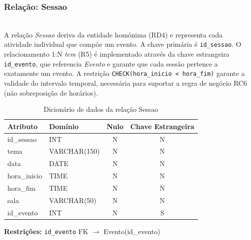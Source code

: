 \documentclass[runningheads]{llncs}
\begin{document}
                \vspace{0.3cm}
                \noindent\begin{minipage}{\textwidth}
                \subsubsection{Relação: Sessao}\mbox{}\\

                A relação \textit{Sessao} deriva da entidade homónima (RD4) e representa cada
                atividade individual que compõe um evento. A chave primária é
                \texttt{id\_sessao}. O relacionamento 1:N \textit{tem} (R5) é implementado através
                da chave estrangeira \texttt{id\_evento}, que referencia \textit{Evento} e garante
                que cada sessão pertence a exatamente um evento. A restrição
                \texttt{CHECK(hora\_inicio < hora\_fim)} garante a validade do intervalo temporal,
                necessária para suportar a regra de negócio RC6 (não sobreposição de horários).

                \begin{table}[H]
                \centering
                \renewcommand{\arraystretch}{1.4}
                \begin{tabular}{|l|l|c|c|}
                \hline
                \textbf{Atributo} & \textbf{Domínio} & \textbf{Nulo} & \textbf{Chave Estrangeira} \\ \hline
                id\_sessao   & INT          & N & N \\ \hline
                tema         & VARCHAR(150) & N & N \\ \hline
                data         & DATE         & N & N \\ \hline
                hora\_inicio & TIME         & N & N \\ \hline
                hora\_fim    & TIME         & N & N \\ \hline
                sala         & VARCHAR(50)  & N & N \\ \hline
                id\_evento   & INT          & N & S \\ \hline
                \end{tabular}
                \vspace{0.2cm}
                \caption{Dicionário de dados da relação Sessao}
                \label{tab:dic_sessao}
                \end{table}
                \noindent\textbf{Restrições:} \texttt{id\_evento} FK $\rightarrow$ Evento(id\_evento)
                \end{minipage}
\end{document}
